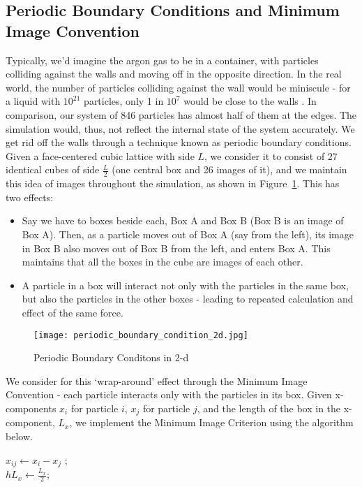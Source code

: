 \documentclass[../Main.tex]{subfiles}
\begin{document}
\subsection{Periodic Boundary Conditions and Minimum Image Convention}
Typically, we'd imagine the argon gas to be in a container, with particles colliding against the walls and moving off in the opposite direction. In the real world, the number of particles colliding against the wall would be miniscule - for a liquid with $10^{21}$ particles, only 1 in $10^{7}$ would be close to the walls \cite{Rapaport2004}. In comparison, our system of 846 particles has almost half of them at the edges. The simulation would, thus, not reflect the internal state of the system accurately. We get rid off the walls through a technique known as periodic boundary conditions.
Given a face-centered cubic lattice with side $L$, we consider it to consist of 27 identical cubes of side $\frac{L}{2}$ (one central box and 26 images of it), and we maintain this idea of images throughout the simulation, as shown in Figure~\ref{periodic_boundary_condition_2d}. This has two effects: 
	\begin{itemize}
	\item
	Say we have to boxes beside each, Box A and Box B (Box B is an image of Box A). Then, as a particle moves out of Box A (say from the left), its image in Box B also moves out of Box B from the left, and enters Box A. This maintains that all the boxes in the cube are images of each other.
	\item
	A particle in a box will interact not only with the particles in the same box, but also the particles in the other boxes - leading to repeated calculation and effect of the same force.
	\end{itemize}

\begin{figure}[t]
\centering
	\texttt{[image: periodic\_boundary\_condition\_2d.jpg]}
  	\caption{Periodic Boundary Conditons in 2-d}
	\label{periodic_boundary_condition_2d}
\end{figure}

We consider for this `wrap-around' effect through the Minimum Image Convention - each particle interacts only with the particles in its box. Given x-components $x_{i}$ for particle $i$, $x_{j}$ for particle $j$, and the length of the box in the x-component, $L_{x}$, we implement the Minimum Image Criterion using the algorithm below.

\begin{algorithm}[H]
\SetAlgoLined
{}

\BlankLine

$x_{ij} \leftarrow x_{i} - x_{j}$ ;\\
$hL_{x} \leftarrow \frac{L_{x}}{2}$; \\
\caption{Minimum Image Convention in 1-d}
\label{algorithm:minimum_image_convention}
\end{algorithm}
\end{document}
